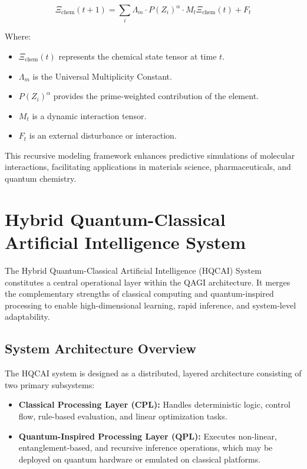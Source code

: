 \documentclass{article}
\theoremstyle{plain}
\theoremstyle{claimstyle}
\begin{document}
\[
\Xi_{\text{chem}}(t+1) = \sum_{i} \Lambda_m \cdot P(Z_i)^{\alpha} \cdot M_t \Xi_{\text{chem}}(t) + F_t
\]

Where:
\begin{itemize}
    \item \( \Xi_{\text{chem}}(t) \) represents the chemical state tensor at time \( t \).
    \item \( \Lambda_m \) is the Universal Multiplicity Constant.
    \item \( P(Z_i)^{\alpha} \) provides the prime-weighted contribution of the element.
    \item \( M_t \) is a dynamic interaction tensor.
    \item \( F_t \) is an external disturbance or interaction.
\end{itemize}

This recursive modeling framework enhances predictive simulations of molecular interactions, facilitating applications in materials science, pharmaceuticals, and quantum chemistry.

\section{Hybrid Quantum-Classical Artificial Intelligence System}

The Hybrid Quantum-Classical Artificial Intelligence (HQCAI) System constitutes a central operational layer within the QAGI architecture. It merges the complementary strengths of classical computing and quantum-inspired processing to enable high-dimensional learning, rapid inference, and system-level adaptability.

\subsection{System Architecture Overview}

The HQCAI system is designed as a distributed, layered architecture consisting of two primary subsystems:
\begin{itemize}
    \item \textbf{Classical Processing Layer (CPL):} Handles deterministic logic, control flow, rule-based evaluation, and linear optimization tasks.
    \item \textbf{Quantum-Inspired Processing Layer (QPL):} Executes non-linear, entanglement-based, and recursive inference operations, which may be deployed on quantum hardware or emulated on classical platforms.
\end{itemize}
\end{document}
